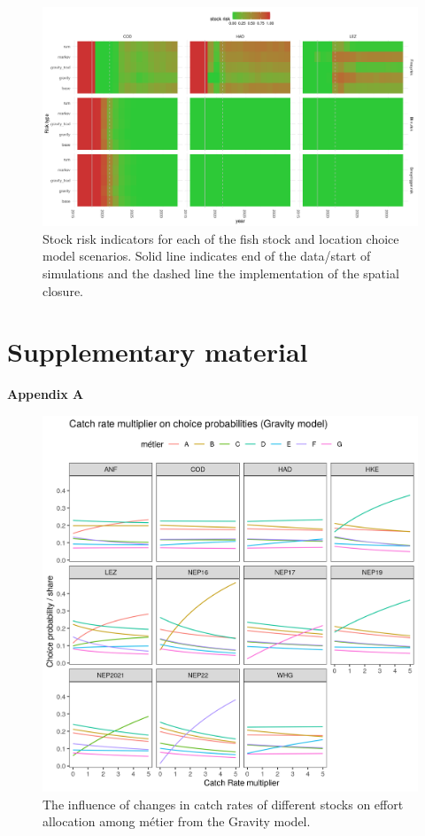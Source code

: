 \documentclass[12pt, halfline, a4paper]{ouparticle}
\begin{document}
\begin{figure}[!ht]
	\centering
	\includegraphics[width=1\linewidth]{figures/stock_risks}
	\caption{Stock risk indicators for each of the fish stock and location
		choice model scenarios. Solid
		line indicates end of the data/start of simulations and the
		dashed line the implementation of the spatial closure.} 
	\label{fig:risk}
\end{figure}	

\clearpage

\section{Supplementary material}
\setcounter{figure}{0} \renewcommand{\thefigure}{A.\arabic{figure}}
\makeatletter
\renewcommand{\thefigure}{S\@arabic\c@figure} 
\makeatletter
\textbf{Appendix A}

\begin{figure}[!ht]
	\centering
	\includegraphics[width=1\linewidth]{figures/Gravity_Metier_Catch_Rate_Multiplier}
	\caption{The influence of changes in catch rates of different stocks on
	effort allocation among métier from the Gravity model.} 
	\label{fig:Grav_CR}
\end{figure}	
\end{document}
